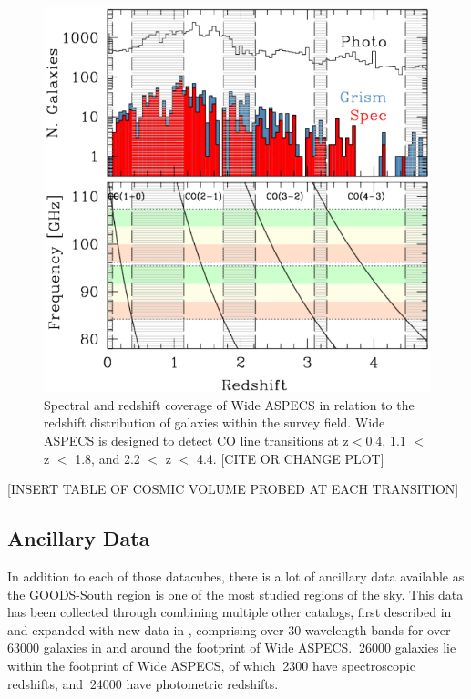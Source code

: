 \begin{figure}[tbp]
\centering
\includegraphics[width=120mm]{Wide_ASPECS_Freq.png}
\caption{Spectral and redshift coverage of Wide ASPECS in relation to the redshift distribution of galaxies within the survey field. Wide ASPECS is designed to detect CO line transitions at z$<$0.4, 1.1 $<$ z $<$ 1.8, and 2.2 $<$ z $<$ 4.4. [CITE OR CHANGE PLOT]}
\label{fig:ASPECS_Freq}
\end{figure}

[INSERT TABLE OF COSMIC VOLUME PROBED AT EACH TRANSITION]

\subsection{Ancillary Data}

In addition to each of those datacubes, there is a lot of ancillary data available as the GOODS-South region is one of the most studied regions of the sky. This data has been collected through combining multiple other catalogs, first described in \cite{walter2016alma} and expanded with new data in \cite{decarli2019alma}, comprising over 30 wavelength bands for over 63000 galaxies in and around the footprint of Wide ASPECS. $~$26000 galaxies lie within the footprint of Wide ASPECS, of which $~$2300 have spectroscopic redshifts, and $~$24000 have photometric redshifts. 

